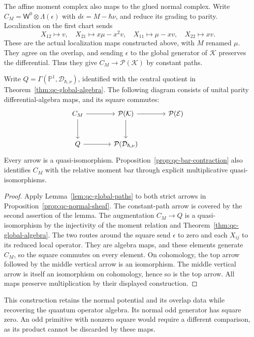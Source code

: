 The affine moment complex also maps to the glued normal complex.
Write $C_M=\mathsf W^0\otimes\Lambda(\epsilon)$ with $d\epsilon=M-\hbar\nu$, and reduce its grading to parity.
Localization on the first chart sends
\[
 X_{12}\mapsto v,\quad X_{21}\mapsto x\mu-x^2v,
 \quad X_{11}\mapsto\mu-xv,\quad X_{22}\mapsto xv.
\]
These are the actual localization maps constructed above, with $M$ renamed $\mu$.
They agree on the overlap, and sending $\epsilon$ to the global generator of $\mathcal K$ preserves the differential.
Thus they give $C_M\to\mathcal P(\mathcal K)$ by constant paths.

\begin{theorem}\label{thm:qc-global-normal}
Write $Q=\Gamma(\mathbb P^1,\mathcal D_{\hbar,\nu})$, identified with the central quotient in Theorem~\ref{thm:qc-global-algebra}.
The following diagram consists of unital parity differential-algebra maps, and its square commutes:
\[
 \begin{tikzcd}[column sep=large,row sep=large]
 C_M\arrow[r]\arrow[d]&\mathcal P(\mathcal K)\arrow[d]\arrow[r]&\mathcal P(\mathcal E)\\
 Q\arrow[r]&\mathcal P(\mathcal D_{\hbar,\nu})&
 \end{tikzcd}
\]
Every arrow is a quasi-isomorphism.
Proposition~\ref{prop:qc-bar-contraction} also identifies $C_M$ with the relative moment bar through explicit multiplicative quasi-isomorphisms.
\end{theorem}
\begin{proof}
Apply Lemma~\ref{lem:qc-global-paths} to both strict arrows in Proposition~\ref{prop:qc-normal-sheaf}.
The constant-path arrow is covered by the second assertion of the lemma.
The augmentation $C_M\to Q$ is a quasi-isomorphism by the injectivity of the moment relation and Theorem~\ref{thm:qc-global-algebra}.
The two routes around the square send $\epsilon$ to zero and each $X_{ij}$ to its reduced local operator.
They are algebra maps, and these elements generate $C_M$, so the square commutes on every element.
On cohomology, the top arrow followed by the middle vertical arrow is an isomorphism.
The middle vertical arrow is itself an isomorphism on cohomology, hence so is the top arrow.
All maps preserve multiplication by their displayed construction.
\end{proof}

This construction retains the normal potential and its overlap data while recovering the quantum operator algebra.
Its normal odd generator has square zero.
An odd primitive with nonzero square would require a different comparison, as its product cannot be discarded by these maps.

